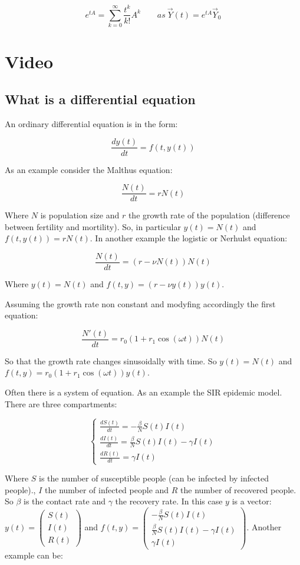 	$$e^{tA} = \sum\limits_{k=0}^\infty\frac{t^k}{k!}A^k\qquad as\ \vec{Y}(t) = e^{tA}\vec{Y}_0$$

\section{Video}

	\subsection{What is a differential equation}
	An ordinary differential equation is in the form:

	$$\frac{dy(t)}{dt} = f(t, y(t))$$

	As an example consider the Malthus equation:

	$$\frac{N(t)}{dt} = rN(t)$$

	Where $N$ is population size and $r$ the growth rate of the population (difference between fertility and mortility).
	So, in particular $y(t) = N(t)$ and $f(t, y(t)) = rN(t)$.
	In another example the logistic or Nerhulst equation:

	$$\frac{N(t)}{dt} = (r-\nu N(t))N(t)$$

	Where $y(t) = N(t)$ and $f(t,y) = (r-\nu y(t))y(t)$.

	Assuming the growth rate non constant and modyfing accordingly the first equation:

	$$\frac{N'(t)}{dt} = r_0(1+r_1\cos(\omega t))N(t)$$

	So that the growth rate changes sinusoidally with time.
	So $y(t) = N(t)$ and $f(t,y) = r_0(1+r_1\cos(\omega t))y(t)$.

	Often there is a system of equation.
	As an example the SIR epidemic model.
	There are three compartments:

	$$\begin{cases}\frac{dS(t)}{dt} = -\frac{\beta}{N} S(t)I(t)\\\frac{dI(t)}{dt} = \frac{\beta}{N} S(t)I(t)-\gamma I(t)\\\frac{dR(t)}{dt} = \gamma I(t)\end{cases}$$

	Where $S$ is the number of susceptible people (can be infected by infected people)., $I$ the number of infected people and $R$ the number of recovered people.
	So $\beta$ is the contact rate and $\gamma$ the recovery rate.
	In this case $y$ is a vector: $y(t) = \begin{pmatrix}S(t)\\I(t)\\R(t)\end{pmatrix}$ and $f(t,y) = \begin{pmatrix}-\frac{\beta}{N} S(t)I(t)\\\frac{\beta}{N} S(t)I(t)-\gamma I(t)\\\gamma I(t)\end{pmatrix}$.
	Another example can be:

